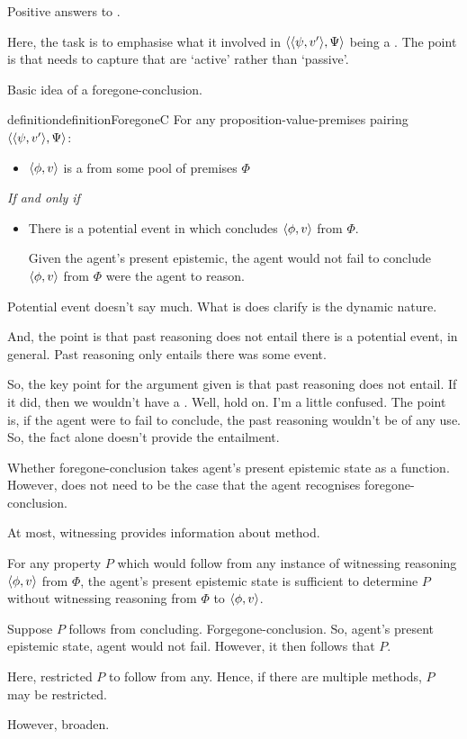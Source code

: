 \begin{note}
  Positive answers to \qzS{}.

  Here, the task is to emphasise what it involved in \(\langle \langle \psi, v' \rangle, \Psi \rangle\) being a \fc{}.
  The point is that \fc{} needs to capture that \fc{} are `active' rather than `passive'.
\end{note}


\begin{note}
  Basic idea of a foregone-conclusion.

  \begin{restatable}{definition}{definitionForegoneC}
    For any proposition-value-premises pairing \(\langle \langle \psi, v' \rangle, \Psi \rangle\):
    \begin{itemize}
    \item
      \(\langle \phi, v \rangle\) is a \emph{} from some pool of premises \(\Phi\)
    \end{itemize}
    \emph{If and only if}
    \begin{itemize}
    \item
      There is a potential event in which \vAgent{} concludes \(\langle \phi, v \rangle\) from \(\Phi\).

      Given the agent's present epistemic, the agent would not fail to conclude \(\langle \phi, v \rangle\) from \(\Phi\) were the agent to reason.
    \end{itemize}
  \end{restatable}

  {
    Potential event doesn't say much.
    What is does clarify is the dynamic nature.

    And, the point is that past reasoning does not entail there is a potential event, in general.
    Past reasoning only entails there was some event.

    So, the key point for the argument given is that past reasoning does not entail.
    If it did, then we wouldn't have a \requ{}.
    Well, hold on.
    I'm a little confused.
    The point is, if the agent were to fail to conclude, the past reasoning wouldn't be of any use.
    So, the fact alone doesn't provide the entailment.
  }

  Whether foregone-conclusion takes agent's present epistemic state as a function.
  However, does not need to be the case that the agent recognises foregone-conclusion.

  At most, witnessing provides information about method.

  For any property \(P\) which would follow from any instance of witnessing reasoning \(\langle \phi, v \rangle\) from \(\Phi\), the agent's present epistemic state is sufficient to determine \(P\) without witnessing reasoning from \(\Phi\) to \(\langle \phi, v \rangle\).

  Suppose \(P\) follows from concluding.
  Forgegone-conclusion.
  So, agent's present epistemic state, agent would not fail.
  However, it then follows that \(P\).

  Here, restricted \(P\) to follow from any.
  Hence, if there are multiple methods, \(P\) may be restricted.

  However, broaden.
\end{note}



